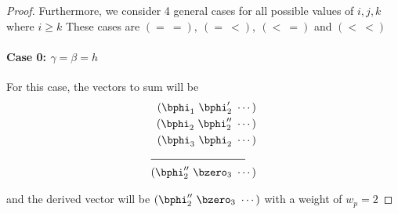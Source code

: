 \begin{proof}
\begin{table}[h!]
\centering
{}
\caption{Truth Table}
\label{tb1}
\end{table}
Furthermore, we consider 4 general cases for all possible values of $i,j,k$ where $i \geq k$ These cases are $(=~=),~(=~<),~(<~=)$ and $(<~<)$
\paragraph{Case 0: $\gamma=\beta=h$ \newline}

 For this case, the vectors to sum will be 
 \begin{align*}
(\bphi_1~\bphi'_2~\cdots)\\
(\bphi_2~\bphi''_2~\cdots)\\
(\bphi_3~\bphi_2~\cdots)\\
\cline{1-2}
(\bphi''_2~\bzero_{3}~\cdots)
\end{align*}
 
and  the derived vector will be $(\bphi''_2~\bzero_{3}~\cdots)$ with a weight of $w_p=2$
 
 

\end{proof}
